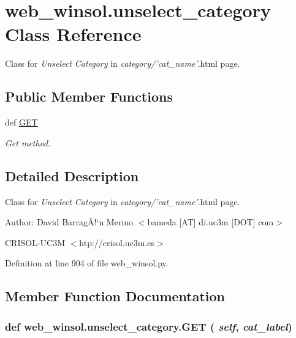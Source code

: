 \hypertarget{classweb__winsol_1_1unselect__category}{
\section{web\_\-winsol.unselect\_\-category Class Reference}
\label{classweb__winsol_1_1unselect__category}
}
Class for {\em Unselect\/} {\em Category\/} in {\em category/'cat\_\-name'\/}.html page.  


\subsection*{Public Member Functions}
\begin{CompactItemize}
\item 
def \hyperlink{classweb__winsol_1_1unselect__category_5aa0ced54544fe7810719ff1df2a51f0}{GET}
\begin{CompactList}\small\item\em Get method. \item\end{CompactList}\end{CompactItemize}


\subsection{Detailed Description}
Class for {\em Unselect\/} {\em Category\/} in {\em category/'cat\_\-name'\/}.html page. 

\begin{Desc}
\item[Author:]David Barrag\~{A}!`n Merino $<$bameda \mbox{[}AT\mbox{]} di.uc3m \mbox{[}DOT\mbox{]} com$>$ 

CRISOL-UC3M $<$htp://crisol.uc3m.es$>$ \end{Desc}




Definition at line 904 of file web\_\-winsol.py.

\subsection{Member Function Documentation}
\hypertarget{classweb__winsol_1_1unselect__category_5aa0ced54544fe7810719ff1df2a51f0}{
\subsubsection[GET]{\setlength{\rightskip}{0pt plus 5cm}def web\_\-winsol.unselect\_\-category.GET ( {\em self},  {\em cat\_\-label})}}
\label{classweb__winsol_1_1unselect__category_5aa0ced54544fe7810719ff1df2a51f0}



